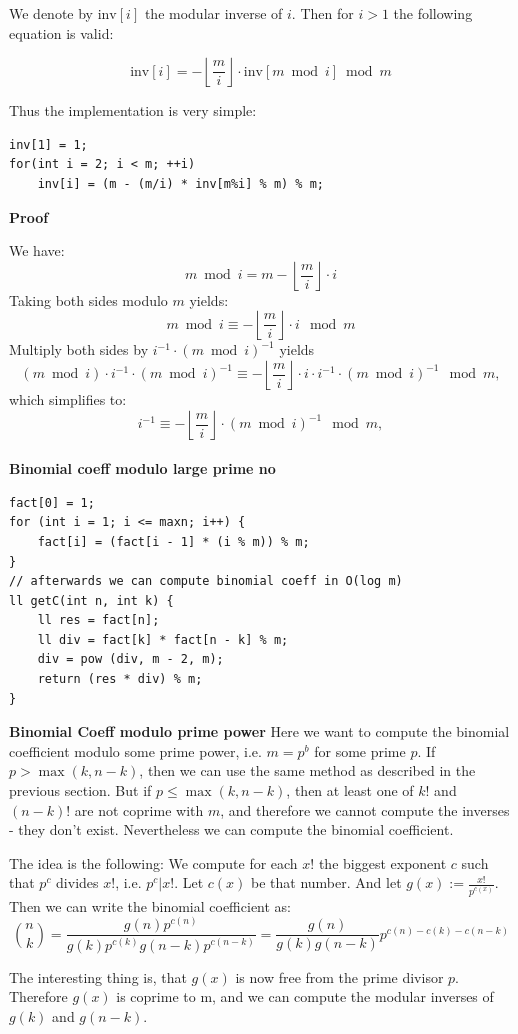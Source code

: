 \documentclass[8pt, a4paper, oneside, twocolumn]{extarticle}
\begin{document}
We denote by $\text{inv}[i]$ the modular inverse of $i$. Then for $i > 1$ the following equation is valid:

$$\text{inv}[i] = - \left\lfloor \frac{m}{i} \right\rfloor \cdot \text{inv}[m \bmod i] \bmod m$$

Thus the implementation is very simple:
\begin{verbatim}
inv[1] = 1;
for(int i = 2; i < m; ++i)
    inv[i] = (m - (m/i) * inv[m%i] % m) % m;
\end{verbatim}
\textbf{Proof}

We have: $$m \bmod i = m - \left\lfloor \frac{m}{i} \right\rfloor \cdot i$$ Taking both sides modulo $m$ yields: $$m \bmod i \equiv - \left\lfloor \frac{m}{i} \right\rfloor \cdot i \mod m$$ Multiply both sides by $i^{-1} \cdot (m \bmod i)^{-1}$ yields $$(m \bmod i) \cdot i^{-1} \cdot (m \bmod i)^{-1} \equiv -\left\lfloor \frac{m}{i} \right\rfloor \cdot i \cdot i^{-1} \cdot (m \bmod i)^{-1} \mod m,$$ which simplifies to: $$i^{-1} \equiv -\left\lfloor \frac{m}{i} \right\rfloor \cdot (m \bmod i)^{-1} \mod m,$$
\\
\textbf{Binomial coeff modulo large prime no}
\begin{verbatim}
fact[0] = 1;
for (int i = 1; i <= maxn; i++) {
    fact[i] = (fact[i - 1] * (i % m)) % m;
}
// afterwards we can compute binomial coeff in O(log m)
ll getC(int n, int k) {
    ll res = fact[n];
    ll div = fact[k] * fact[n - k] % m;
    div = pow (div, m - 2, m);
    return (res * div) % m;
}
\end{verbatim}
\textbf{Binomial Coeff modulo prime power}
Here we want to compute the binomial coefficient modulo some prime power, i.e. $m = p^b$ for some prime $p$. If $p > \max(k, n-k)$, then we can use the same method as described in the previous section. But if $p \le \max(k, n-k)$, then at least one of $k!$ and $(n-k)!$ are not coprime with $m$, and therefore we cannot compute the inverses - they don't exist. Nevertheless we can compute the binomial coefficient.

The idea is the following: We compute for each $x!$ the biggest exponent $c$ such that $p^c$ divides $x!$, i.e. $p^c | x!$. Let $c(x)$ be that number. And let $g(x) := \frac{x!}{p^{c(x)}}$. Then we can write the binomial coefficient as: $$\binom n k = \frac {g(n) p^{c(n)}} {g(k) p^{c(k)} g(n-k) p^{c(n-k)}} = \frac {g(n)} {g(k) g(n-k)}p^{c(n) - c(k) - c(n-k)}$$

The interesting thing is, that $g(x)$ is now free from the prime divisor $p$. Therefore $g(x)$ is coprime to m, and we can compute the modular inverses of $g(k)$ and $g(n-k)$.
\end{document}
